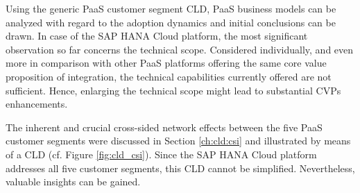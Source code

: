 Using the generic \ac{PaaS} customer segment \ac{CLD}, \ac{PaaS} business models can be analyzed with regard to the adoption dynamics and initial conclusions can be drawn. In case of the SAP HANA Cloud platform, the most significant observation so far concerns the technical scope. Considered individually, and even more in comparison with other \ac{PaaS} platforms offering the same core value proposition of integration, the technical capabilities currently offered are not sufficient. Hence, enlarging the technical scope might lead to substantial \acp{CVP} enhancements.

The inherent and crucial cross-sided network effects between the five \ac{PaaS} customer segments were discussed in Section \ref{ch:cld:csi} and illustrated by means of a \ac{CLD} (cf. Figure \ref{fig:cld_csi}). Since the SAP HANA Cloud platform addresses all five customer segments, this \ac{CLD} cannot be simplified. Nevertheless, valuable insights can be gained.

